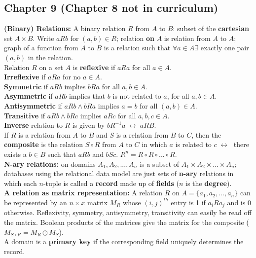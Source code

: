 \documentclass[12pt]{article}
\renewcommand{\iff}{\;\leftrightarrow\;}
\begin{document}
\subsection{Chapter 9 (Chapter 8 not in curriculum)}
\textbf{(Binary) Relations:} A binary relation $R$ from $A$ to $B$: subset of the \textbf{cartesian} set $A \times B$. Write $aRb$ for $(a,b) \in R$; relation \textbf{on} $A$ is relation from $A$ to $A$; graph of a function from $A$ to $B$ is a relation such that $\forall a \in A \exists $ exactly one pair $(a,b)$ in the relation. \\
Relation $R$ on a set $A$ is \textbf{reflexive} if $aRa$ for all $a \in A$.\\
\textbf{Irreflexive} if $aRa$ for no $a \in A$. \\
\textbf{Symmetric} if $aRb$ implies $bRa$ for all $a,b \in A$. \\
\textbf{Asymmetric} if $aRb$ implies that $b$ is not related to $a$, for all $a,b \in A$. \\
\textbf{Antisymmetric} if $aRb \wedge bRa$ implies $a = b$ for all $(a,b) \in A$. \\
\textbf{Transitive} if $aRb \wedge bRc$ implies $aRc$ for all $a,b,c \in A$. \\
\textbf{Inverse} relation to $R$ is given by  $bR^{-1}a \iff aRB$. \\
If $R$ is a relation from $A$ to $B$ and $S$ is a relation from $B$ to $C$, then the \textbf{composite} is the relation $S \circ R$ from $A$ to $C$ in which $a$ is related to $c \iff$ there exists a $b \in B$ such that $aRb$ and $bSc$. $R^n = R \circ R \circ ... \circ R$. \\
\textbf{N-ary relations:} on domains $A_1,A_2,...,A_n$ is a subset of $A_1 \times A_2 \times ... \times A_n$; databases using the relational data model are just sets of \textbf{n-ary} relations in which each $n$-tuple is called a \textbf{record} made up of \textbf{fields} ($n$ is the \textbf{degree}). \\
\textbf{A relation as matrix representation:} A relation $R$ on $A = \{ a_1,a_2,...,a_n\}$ can be represented by an $n \times x$ matrix $M_R$ whose $(i,j)^{th}$ entry is 1 if $a_iRa_j$ and is 0 otherwise. Reflexivity, symmetry, antisymmetry, transitivity can easily be read off the matrix. Boolean products of the matrices give the matrix for the composite ($M_{S \circ R} = M_R \odot M_S$). \\
A domain is a \textbf{primary key} if the corresponding field uniquely determines the record. \\
\end{document}
